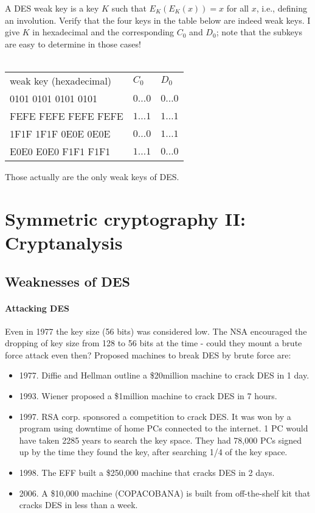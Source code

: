 \documentclass[a4paper, 11pt, openany]{book}
\begin{document}
\begin{exercise} \label{exercise:weak_keys}
A DES weak key is a key $K$ such that $E_K(E_K(x)) = x$ for all $x$, i.e., defining
an involution.
Verify that the four keys in the table below are indeed weak keys. I give $K$ in hexadecimal and the corresponding $C_0$ and $D_0$; note that the subkeys are easy to determine in those cases!\\
~\\
\begin{tabular}{lll}
weak key (hexadecimal) & $C_0$ & $D_0$\\
0101 0101 0101 0101 & $0\dots0$ & $0\dots0$\\
FEFE FEFE FEFE FEFE & $1\dots1$ & $1\dots1$\\
1F1F 1F1F 0E0E 0E0E & $0\dots0$ & $1\dots1$\\
E0E0 E0E0 F1F1 F1F1 & $1\dots1$ & $0\dots0$
\end{tabular}

Those actually are the only weak keys of DES.
\end{exercise}





\section{Symmetric cryptography II: Cryptanalysis}
\label{sec:13}


\subsection{Weaknesses of DES}


\paragraph{Attacking DES}
Even in 1977 the key size (56 bits) was considered low.
The NSA encouraged the dropping of key size from 128 to 56 bits at the time - could they mount a brute force attack even then?
Proposed machines to break DES by brute force are:
\begin{itemize}
    \item 1977. Diffie and Hellman outline a \$20million machine to crack DES in 1 day.

    \item 1993. Wiener proposed a \$1million machine to crack DES in 7 hours.

    \item 1997. RSA corp. sponsored a competition to crack DES. It was won by a program using downtime of home PCs connected to the internet. 1 PC would have taken 2285 years to search the key space. They had 78,000 PCs signed up by the time they found the key, after searching 1/4 of the key space.

    \item 1998. The EFF built a \$250,000 machine that cracks DES in 2 days.

    \item 2006. A \$10,000 machine (COPACOBANA) is built from off-the-shelf kit that cracks DES in less than a week.
\end{itemize}
\end{document}
